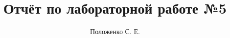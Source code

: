 \title{Отчёт по лабораторной работе №5}
\author{Положенко С. Е.}

\usepackage[a4paper, left=20mm, top=15mm, right=15mm, bottom=15mm]{geometry}
\setmainfont{Lato}

\usepackage{caption}
\captionsetup[figure]{name=Рисунок, labelsep=endash}

\renewcommand{\contentsname}{Оглавление}


\usepackage{titlesec}
\newcommand{\sectionbreak}{\clearpage}

\usepackage{fancyhdr}
\pagestyle{fancy}
\fancyhf{}
\renewcommand{\headrulewidth}{0pt}
\fancyfoot[R]{\thepage}

